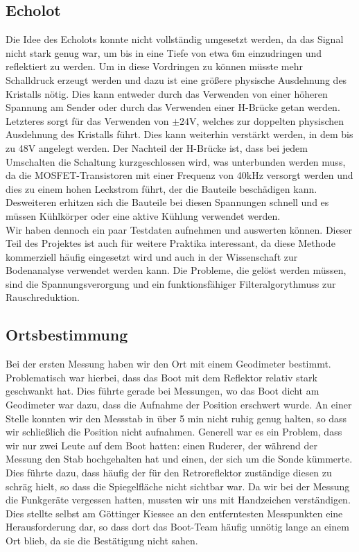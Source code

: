 \documentclass[12pt,a4paper,titlepage,headinclude,bibtotoc]{scrartcl}
\numberwithin{equation}{subsection}
\begin{document}
\subsection{Echolot}
Die Idee des Echolots konnte nicht vollständig umgesetzt werden, da das Signal nicht stark genug war, um bis in eine Tiefe von etwa 6\si{\meter} einzudringen und reflektiert zu werden.
Um in diese Vordringen zu können müsste mehr Schalldruck erzeugt werden und dazu ist eine größere physische Ausdehnung des Kristalls nötig.
Dies kann entweder durch das Verwenden von einer höheren Spannung am Sender oder durch das Verwenden einer H-Brücke getan werden.
Letzteres sorgt für das Verwenden von $\pm24\si{\volt}$, welches zur doppelten physischen Ausdehnung des Kristalls führt.
Dies kann weiterhin verstärkt werden, in dem bis zu 48\si{\volt} angelegt werden.
Der Nachteil der H-Brücke ist, dass bei jedem Umschalten die Schaltung kurzgeschlossen wird, was unterbunden werden muss, da die MOSFET-Transistoren mit einer Frequenz von 40\si{\kilo\hertz} versorgt werden und dies zu einem hohen Leckstrom führt, der die Bauteile beschädigen kann.
Desweiteren erhitzen sich die Bauteile bei diesen Spannungen schnell und es müssen Kühlkörper oder eine aktive Kühlung verwendet werden.\\
Wir haben dennoch ein paar Testdaten aufnehmen und auswerten können.
Dieser Teil des Projektes ist auch für weitere Praktika interessant, da diese Methode kommerziell häufig eingesetzt wird und auch in der Wissenschaft zur Bodenanalyse verwendet werden kann.
Die Probleme, die gelöst werden müssen, sind die Spannungsverorgung und ein funktionsfähiger Filteralgorythmuss zur Rauschreduktion.

\subsection{Ortsbestimmung}
Bei der ersten Messung haben wir den Ort mit einem Geodimeter bestimmt.
Problematisch war hierbei, dass das Boot mit dem Reflektor relativ stark geschwankt hat.
Dies führte gerade bei Messungen, wo das Boot dicht am Geodimeter war dazu, dass die Aufnahme der Position erschwert wurde.
An einer Stelle konnten wir den Messstab in über 5 min nicht ruhig genug halten, so dass wir schließlich die Position nicht aufnahmen.
Generell war es ein Problem, dass wir nur zwei Leute auf dem Boot hatten: einen Ruderer, der während der Messung den Stab hochgehalten hat und einen, der sich um die Sonde kümmerte.
Dies führte dazu, dass häufig der für den Retroreflektor zuständige diesen zu schräg hielt, so dass die Spiegelfläche nicht sichtbar war.
Da wir bei der Messung die Funkgeräte vergessen hatten, mussten wir uns mit Handzeichen verständigen.
Dies stellte selbst am Göttinger Kiessee an den entferntesten Messpunkten eine Herausforderung dar, so dass dort das Boot-Team häufig unnötig lange an einem Ort blieb, da sie die Bestätigung nicht sahen.
\end{document}
